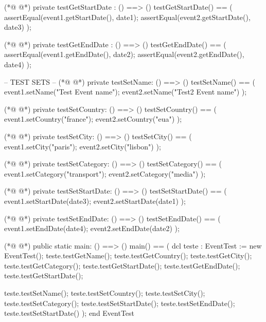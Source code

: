 \begin{vdmpp}[breaklines=true]
(*@
\label{testGetStartDate:135}
@*)
 private testGetStartDate : () ==> ()
  testGetStartDate() == 
  (
   assertEqual(event1.getStartDate(), date1);
   assertEqual(event2.getStartDate(), date3)
  );
  
(*@
\label{testGetEndDate:142}
@*)
 private testGetEndDate : () ==> ()
  testGetEndDate() == 
  (
   assertEqual(event1.getEndDate(), date2);
   assertEqual(event2.getEndDate(), date4)
  );
   
 -- TEST SETS --
(*@
\label{testSetName:150}
@*)
 private testSetName: () ==> ()
  testSetName() ==
  (
   event1.setName("Test Event name");
   event2.setName("Test2 Event name")
  );
  
(*@
\label{testSetCountry:157}
@*)
 private testSetCountry: () ==> ()
  testSetCountry() ==
  (
   event1.setCountry("france");
   event2.setCountry("eua")
  );
  
(*@
\label{testSetCity:164}
@*)
 private testSetCity: () ==> ()
  testSetCity() ==
  (
   event1.setCity("paris");
   event2.setCity("lisbon")
  );
 
(*@
\label{testSetCategory:171}
@*)
 private testSetCategory: () ==> ()
  testSetCategory() ==
  (
   event1.setCategory("transport");
   event2.setCategory("media")
  );
  
(*@
\label{testSetStartDate:178}
@*)
 private testSetStartDate: () ==> ()
  testSetStartDate() ==
  (
   event1.setStartDate(date3);
   event2.setStartDate(date1)
  );
  
(*@
\label{testSetEndDate:185}
@*)
 private testSetEndDate: () ==> ()
  testSetEndDate() ==
  (
   event1.setEndDate(date4);
   event2.setEndDate(date2)
  );
  
(*@
\label{main:192}
@*)
 public static main: () ==> ()
  main() ==
  (
   dcl teste : EventTest := new EventTest();
   teste.testGetName();
   teste.testGetCountry();
   teste.testGetCity();
   teste.testGetCategory();
   teste.testGetStartDate();
   teste.testGetEndDate();
   teste.testGetStartDate();
   
   teste.testSetName();
   teste.testSetCountry();
   teste.testSetCity();
   teste.testSetCategory();
   teste.testSetStartDate();
   teste.testSetEndDate();
   teste.testSetStartDate()
  );
end EventTest
\end{vdmpp}
\bigskip
